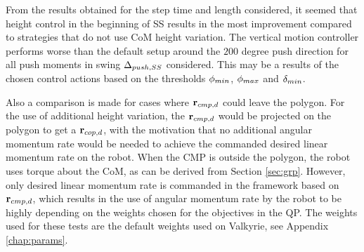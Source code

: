 From the results obtained for the step time and length considered, it seemed that height control in the beginning of \ac{SS} results in the most improvement compared to strategies that do not use \ac{CoM} height variation. The vertical motion controller performs worse than the default setup around the $200$ degree push direction for all push moments in swing $\Delta_{push,SS}$ considered. This may be a results of the chosen control actions based on the thresholds $\phi_{min}$, $\phi_{max}$ and $\delta_{min}$.

Also a comparison is made for cases where $\mathbf{r}_{cmp,d}$ could leave the polygon. For the use of additional height variation, the $\mathbf{r}_{cmp,d}$ would be projected on the polygon to get a $\mathbf{r}_{cop,d}$, with the motivation that no additional angular momentum rate would be needed to achieve the commanded desired linear momentum rate on the robot. When the \ac{CMP} is outside the polygon, the robot uses torque about the \ac{CoM}, as can be derived from Section \ref{sec:grp}. However, only desired linear momentum rate is commanded in the framework based on $\mathbf{r}_{cmp,d}$, which results in the use of angular momentum rate by the robot to be highly depending on the weights chosen for the objectives in the \ac{QP}. The weights used for these tests are the default weights used on Valkyrie, see Appendix \ref{chap:params}.
